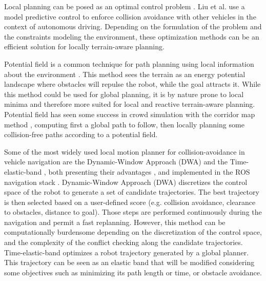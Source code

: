 Local planning can be posed as an optimal control problem \cite{optimal_control_path_planning}. 
Liu et al. \cite{liu_mpc_path_planning_2017} use a model predictive control to enforce collision avoidance with other vehicles in the context of autonomous driving.
Depending on the formulation of the problem and the constraints modeling the environment, these optimization methods can be an efficient solution for locally terrain-aware planning.

Potential field \cite{potential_field_1992} is a common technique for path planning using local information about the environment \cite{mpc_potential_field_car_2017}. 
This method sees the terrain as an energy potential landscape where obstacles will repulse the robot, while the goal attracts it.
While this method could be used for global planning, it is by nature prone to local minima and therefore more suited for local and reactive terrain-aware planning.
Potential field has seen some success in crowd simulation with the corridor map method \cite{corridor_geraerts_2007, explicit_corridors_2010}, computing first a global path to follow, then locally planning some collision-free paths according to a potential field.

Some of the most widely used local motion planner for collision-avoidance in vehicle navigation are the Dynamic-Window Approach (DWA) \cite{dynamic_window_fox_1997} and the Time-elastic-band \cite{elastic_band_2013}, both presenting their advantages \cite{dwa_vs_teb_2021_rosmann, dimitri_these_2021}, and implemented in the ROS navigation stack \cite{ROS_software}.
Dynamic-Window Approach (DWA) \cite{dynamic_window_fox_1997} discretizes the control space of the robot to generate a set of candidate trajectories. 
The best trajectory is then selected based on a user-defined score (e.g. collision avoidance, clearance to obstacles, distance to goal). Those steps are performed continuously during the navigation and permit a fast replanning. However, this method can be computationally burdensome depending on the discretization of the control space, and the complexity of the conflict checking along the candidate trajectories.
Time-elastic-band \cite{elastic_band_2013} optimizes a robot trajectory generated by a global planner. This trajectory can be seen as an elastic band that will be modified considering some objectives such as minimizing its path length or time, or obstacle avoidance.

